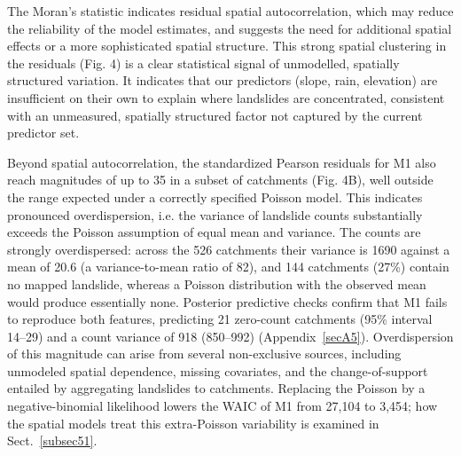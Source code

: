 \documentclass[journal abbreviation, manuscript]{copernicus}
\newcommand{\hl}[1]{#1}
\newcommand{\hlE}[1]{#1}
\begin{document}
The Moran’s statistic indicates residual spatial autocorrelation, which may reduce the reliability of the model estimates, and suggests the need for additional spatial effects or a more sophisticated spatial structure. 
This strong spatial clustering in the residuals (Fig. 4) is a clear statistical signal of \hlE{unmodelled, spatially structured variation}. 
It indicates that our predictors (slope, rain, elevation) are insufficient on their own to explain where landslides are concentrated, \hl{consistent with an unmeasured, spatially structured factor not captured by the current predictor set.}

\hl{Beyond spatial autocorrelation, the standardized Pearson residuals for M1 also reach magnitudes of} \hlE{up to 35} \hl{in a subset of catchments (Fig. 4B), well outside the range expected under a correctly specified Poisson model. 
This indicates pronounced overdispersion, i.e. the variance of landslide counts substantially exceeds the Poisson assumption of equal mean and variance.} 
\hlE{The counts are strongly overdispersed: across the 526 catchments their variance is 1690 against a mean of 20.6 (a variance-to-mean ratio of 82), and 144 catchments (27\%) contain no mapped landslide, whereas a Poisson distribution with the observed mean would produce essentially none. Posterior predictive checks confirm that M1 fails to reproduce both features, predicting 21 zero-count catchments (95\% interval 14--29) and a count variance of 918 (850--992) (\mbox{Appendix~\ref{secA5}}).} \hl{Overdispersion of this magnitude can arise from several non-exclusive sources, including unmodeled spatial dependence, missing covariates, and the change-of-support entailed by aggregating} \hlE{landslides to catchments. Replacing the Poisson by a negative-binomial likelihood lowers the WAIC of M1 from 27,104 to 3,454; how the spatial models treat this extra-Poisson variability is examined in \mbox{Sect.~\ref{subsec51}}.}
\end{document}
